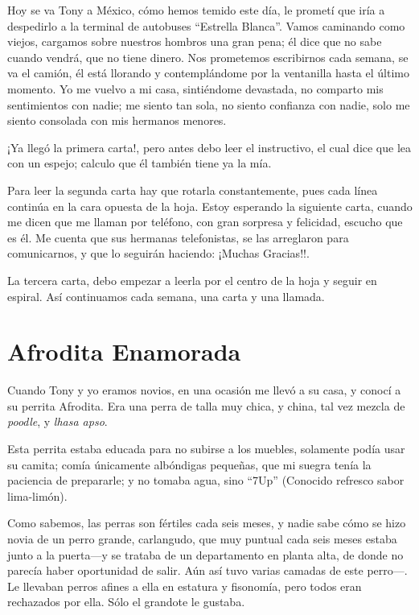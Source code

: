 \documentclass[letterpaper, 12pt]{book}
\begin{document}
Hoy se va Tony a México, cómo hemos temido este día, le prometí que iría a despedirlo a la terminal de autobuses ``Estrella Blanca''. Vamos caminando como viejos, cargamos sobre nuestros hombros una gran pena; él dice que no sabe cuando vendrá, que no tiene dinero. Nos prometemos escribirnos cada semana, se va el camión, él está llorando y contemplándome por la ventanilla hasta el último momento. Yo me vuelvo a mi casa, sintiéndome devastada, no comparto mis sentimientos con nadie; me siento tan sola, no siento confianza con nadie, solo me siento consolada con mis hermanos menores. 

¡Ya llegó la primera carta!, pero antes debo leer el instructivo, el cual dice que lea con un espejo; calculo que él también tiene ya la mía. 

Para leer la segunda carta hay que rotarla constantemente, pues cada línea continúa en la cara opuesta de la hoja. Estoy esperando la siguiente carta, cuando me dicen que me llaman por teléfono, con gran sorpresa y felicidad, escucho que es él. Me cuenta que sus hermanas telefonistas, se las arreglaron para comunicarnos, y que lo seguirán haciendo: ¡Muchas Gracias!!.

La tercera carta, debo empezar a leerla por el centro de la hoja y seguir en espiral. Así continuamos cada semana, una carta y una llamada. 

\chapter{Afrodita Enamorada}
Cuando Tony y yo eramos novios, en una ocasión me llevó a su casa, y conocí a su perrita Afrodita. Era una perra de talla muy chica, y china, tal vez mezcla de \textit{poodle}, y \textit{lhasa apso}. 

Esta perrita estaba educada para no subirse a los muebles, solamente podía usar su camita; comía únicamente albóndigas pequeñas, que mi suegra tenía la paciencia de prepararle; y no tomaba agua, sino ``7Up'' (Conocido refresco sabor lima-limón).

Como sabemos, las perras son fértiles cada seis meses, y nadie sabe cómo se hizo novia de un perro grande, carlangudo, que muy puntual cada seis meses estaba junto a la puerta---y se trataba de un departamento en planta alta, de donde no parecía haber oportunidad de salir. Aún así tuvo varias camadas de este perro---. Le llevaban perros afines a ella en estatura y fisonomía, pero todos eran rechazados por ella. Sólo el grandote le gustaba.
\end{document}
